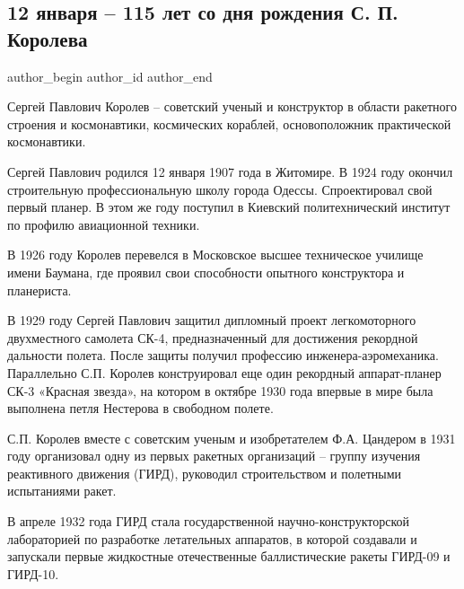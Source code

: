  
 
 
 
 
\subsection{12 января – 115 лет со дня рождения С. П. Королева}
\label{sec:12_01_2022.stz.sport.lnr.turizm_lugasport_info.1.korolev_115_let}

\ifcmt
 author_begin
   author_id  
 author_end
\fi

Сергей Павлович Королев – советский ученый и конструктор в области ракетного
строения и космонавтики,  космических кораблей, основоположник практической
космонавтики.

Сергей Павлович родился 12 января 1907 года в Житомире. В 1924 году окончил
строительную профессиональную школу города Одессы. Спроектировал свой первый
планер. В этом же году поступил в Киевский политехнический институт по профилю
авиационной техники.


В 1926 году Королев перевелся в Московское высшее техническое училище имени
Баумана, где проявил свои способности опытного конструктора и планериста.

В 1929 году Сергей Павлович защитил дипломный проект легкомоторного
двухместного самолета СК-4, предназначенный для достижения рекордной дальности
полета. После защиты получил профессию инженера-аэромеханика. Параллельно С.П.
Королев конструировал еще один рекордный аппарат-планер СК-3 «Красная звезда»,
на котором в октябре 1930 года впервые в мире была выполнена петля Нестерова в
свободном полете.

С.П. Королев вместе с советским ученым и изобретателем Ф.А. Цандером в 1931
году организовал одну из первых ракетных организаций – группу изучения
реактивного движения (ГИРД), руководил строительством и полетными испытаниями
ракет.

В апреле 1932 года ГИРД стала государственной научно-конструкторской
лабораторией по разработке летательных аппаратов, в которой создавали и
запускали первые жидкостные отечественные баллистические ракеты ГИРД-09 и
ГИРД-10.

